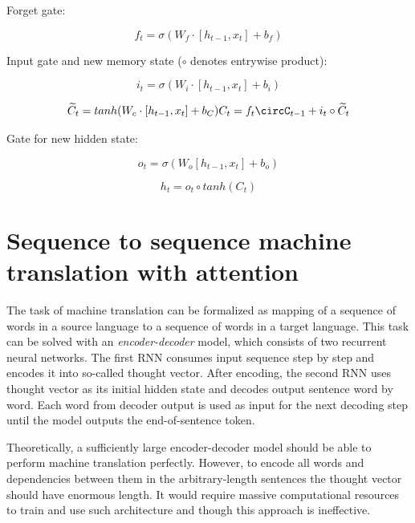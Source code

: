 Forget gate:

\begin{equation}
f_t = \sigma(W_f\cdot[h_{t-1},x_t] + b_f)
\label{lstm:ft}
\end{equation} 

Input gate and new memory state ($\circ$ denotes entrywise product):

\begin{equation}
i_t=\sigma(W_i\cdot[h_{t-1}, x_t]+b_i)
\label{lstm:input}
\end{equation} 

\begin{equation}
\widetilde{C}_t = tanh(W_c\cdot[h_{t-1}, x_t]+b_C)

C_t = f_t\circC_{t-1}+i_t\circ\widetilde{C}_t
\label{lstm:c}
\end{equation} 

Gate for new hidden state:

\begin{equation}
o_t=\sigma(W_o[h_{t-1},x_t]+b_o)
\label{lstm:o}
\end{equation} 

\begin{equation}
h_t=o_t\circ tanh(C_t)
\label{lstm:o}
\end{equation} 

\section{Sequence to sequence machine translation with attention}
The task of machine translation can be formalized as mapping of a sequence of words in a source language to a sequence of words in a target language. This task can be solved with an \emph{encoder-decoder} model, which consists of two recurrent neural networks. The first RNN consumes input sequence step by step and encodes it into so-called thought vector. After encoding, the second RNN uses thought vector as its initial hidden state and decodes output sentence word by word.  Each word from decoder output is used as input for the next decoding step until the model outputs the end-of-sentence token. 

Theoretically, a sufficiently large encoder-decoder model should be able to perform machine translation perfectly. However, to encode all words and dependencies between them in the arbitrary-length sentences the thought vector should have enormous length. It would require massive computational resources to train and use such architecture and though this approach is ineffective.


